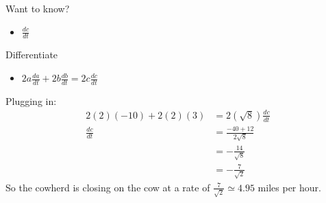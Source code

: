 \documentclass{ximera}
\begin{document}
\begin{exercise}
\begin{hint}
Want to know?

\begin{itemize}
\itemsep1pt\parskip0pt
\item
  $\frac{dc}{dt}$
\end{itemize}

Differentiate

\begin{itemize}
\itemsep1pt\parskip0pt
\item
  $2a\frac{da}{dt} + 2b\frac{db}{dt} = 2c\frac{dc}{dt}$
\end{itemize}

Plugging in: \begin{align*}
2(2)\left(-10\right) + 2(2)\left(3\right) &= 2(\sqrt{8})\frac{dc}{dt} \\
\frac{dc}{dt} &= \frac{-40+12}{2\sqrt{8}} \\
&= -\frac{14}{\sqrt{8}} \\
&= -\frac{7}{\sqrt{2}}
\end{align*} So the cowherd is closing on the cow at a rate of
$\frac{7}{\sqrt{2}} \simeq 4.95$ miles per hour.
\end{hint}


\begin{multipleChoice}
\end{multipleChoice}

\end{exercise}
\end{document}
